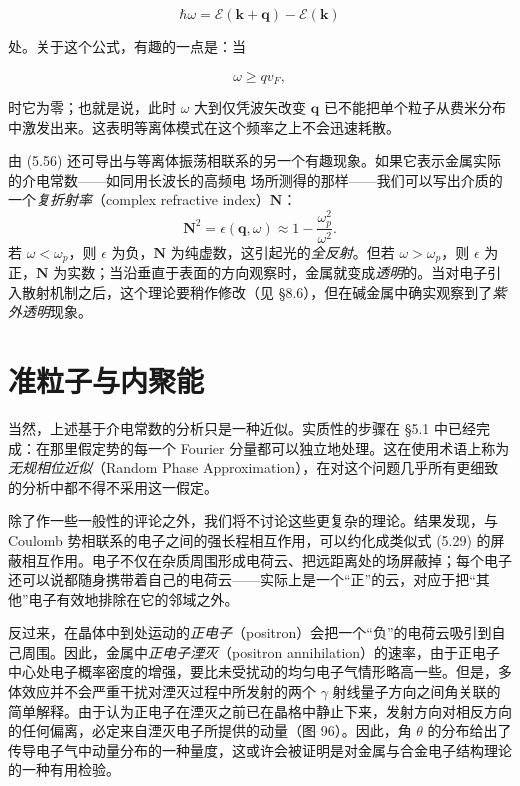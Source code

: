 \begin{equation*}
\hbar\omega = \mathcal{E}(\mathbf{k}+\mathbf{q}) - \mathcal{E}(\mathbf{k})
\tag{5.65}
\end{equation*}

处。关于这个公式，有趣的一点是：当

\begin{equation*}
\omega \geqslant q v_F,
\tag{5.66}
\end{equation*}

时它为零；也就是说，此时 $\omega$ 大到仅凭波矢改变 $\mathbf{q}$ 已不能把单个粒子从费米分布中激发出来。这表明等离体模式在这个频率之上不会迅速耗散。

由 (5.56) 还可导出与等离体振荡相联系的另一个有趣现象。如果它表示金属实际的介电常数——如同用长波长的高频电
场所测得的那样——我们可以写出介质的一个\emph{复折射率}（complex refractive index）$\mathbf{N}$：
\begin{equation*}
\mathbf{N}^{2}=\epsilon(\mathbf{q},\omega)\approx 1-\frac{\omega_{p}^{2}}{\omega^{2}}. \tag{5.67}
\end{equation*}
若 $\omega<\omega_{p}$，则 $\epsilon$ 为负，$\mathbf{N}$ 为纯虚数，这引起光的\emph{全反射}。但若 $\omega>\omega_{p}$，则 $\epsilon$ 为正，$\mathbf{N}$ 为实数；当沿垂直于表面的方向观察时，金属就变成\emph{透明}的。当对电子引入散射机制之后，这个理论要稍作修改（见 §8.6），但在碱金属中确实观察到了\emph{紫外透明}现象。

\section{准粒子与内聚能}

当然，上述基于介电常数的分析只是一种近似。实质性的步骤在 §5.1 中已经完成：在那里假定势的每一个 Fourier 分量都可以独立地处理。这在使用术语上称为\emph{无规相位近似}（Random Phase Approximation），在对这个问题几乎所有更细致的分析中都不得不采用这一假定。

除了作一些一般性的评论之外，我们将不讨论这些更复杂的理论。结果发现，与 Coulomb 势相联系的电子之间的强长程相互作用，可以约化成类似式 (5.29) 的屏蔽相互作用。电子不仅在杂质周围形成电荷云、把远距离处的场屏蔽掉；每个电子还可以说都随身携带着自己的电荷云——实际上是一个“正”的云，对应于把“其他”电子有效地排除在它的邻域之外。

反过来，在晶体中到处运动的\emph{正电子}（positron）会把一个“负”的电荷云吸引到自己周围。因此，金属中\emph{正电子湮灭}（positron annihilation）的速率，由于正电子中心处电子概率密度的增强，要比未受扰动的均匀电子气情形略高一些。但是，多体效应并不会严重干扰对湮灭过程中所发射的两个 $\gamma$ 射线量子方向之间角关联的简单解释。由于认为正电子在湮灭之前已在晶格中静止下来，发射方向对相反方向的任何偏离，必定来自湮灭电子所提供的动量（图 96）。因此，角 $\theta$ 的分布给出了传导电子气中动量分布的一种量度，这或许会被证明是对金属与合金电子结构理论的一种有用检验。

